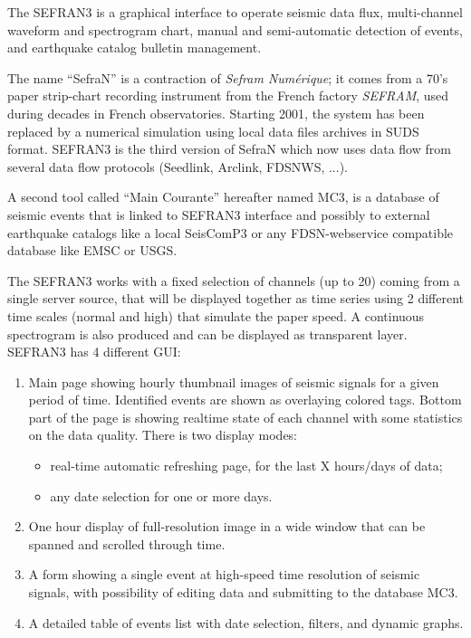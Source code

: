 The SEFRAN3 is a graphical interface to operate seismic data flux, multi-channel waveform and spectrogram chart, manual and semi-automatic detection of events, and earthquake catalog bulletin management.

The name ``SefraN'' is a contraction of \textit{Sefram Numérique}; it comes from a 70's paper strip-chart recording instrument from the French factory \textit{SEFRAM\textregistered}, used during decades in French observatories. Starting 2001, the system has been replaced by a numerical simulation using local data files archives in SUDS format. SEFRAN3 is the third version of SefraN which now uses data flow from several data flow protocols (Seedlink, Arclink, FDSNWS, ...).

A second tool called ``Main Courante'' hereafter named MC3, is a database of seismic events that is linked to SEFRAN3 interface and possibly to external earthquake catalogs like a local SeisComP3 or any FDSN-webservice compatible database like EMSC or USGS.

The SEFRAN3 works with a fixed selection of channels (up to 20) coming from a single server source, that will be displayed together as time series using 2 different time scales (normal and high) that simulate the paper speed. A continuous spectrogram is also produced and can be displayed as transparent layer. SEFRAN3 has 4 different GUI:
\begin{enumerate}

\item Main page showing hourly thumbnail images of seismic signals for a given period of time. Identified events are shown as overlaying colored tags. Bottom part of the page is showing realtime state of each channel with some statistics on the data quality. There is two display modes:
\begin{itemize}
\item real-time automatic refreshing page, for the last X hours/days of data;
\item any date selection for one or more days.
\end{itemize}

\item One hour display of full-resolution image in a wide window that can be spanned and scrolled through time.

\item A form showing a single event at high-speed time resolution of seismic signals, with possibility of editing data and submitting to the database MC3.

\item A detailed table of events list with date selection, filters, and dynamic graphs.

\end{enumerate}

